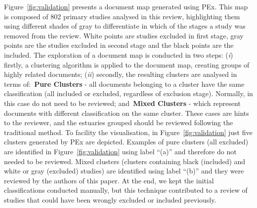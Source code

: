 Figure~\ref{fig:validation} presents a document map generated using PEx. This map is composed of 802 primary studies analysed in this review, highlighting them using different shades of gray to differentiate in which of the stages a study was removed from the review. White points are studies excluded in first stage, gray points are the studies excluded in second stage and the black points are the included. The exploration of a document map is conducted in two steps: (\textit{i}) firstly, a clustering algorithm is applied to the document map, creating groups of highly related documents; (\textit{ii}) secondly, the resulting clusters are analysed in terms of:~\textbf{Pure Clusters} - all documents belonging to a cluster have the same classification (all included or excluded, regardless of exclusion stage). Normally, in this case do not need to be reviewed; and~\textbf{Mixed Clusters} - which represent documents with different classification on the same cluster. These cases are hints to the reviewer, and the estuaries grouped should be reviewed following the traditional method. To facility the visualisation, in Figure~\ref{fig:validation} just five clusters generated by PEx are depicted. Examples of pure clusters (all excluded) are identified in Figure~\ref{fig:validation} using label ``(a)'' and therefore do not needed to be reviewed. Mixed clusters (clusters containing black (included) and white or gray (excluded) studies) are identified using label ``(b)'' and they were reviewed by the authors of this paper. At the end, we kept the initial classifications conducted manually, but this technique contributed to a review of studies that could have been wrongly excluded or included previously.  

